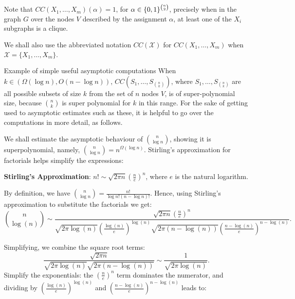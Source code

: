 Note that $CC\left(X_1, \ldots, X_m\right)(\alpha)=1$, for $\alpha\in\{0,1\}^{n\choose 2}$, precisely when in the graph $G$ over the nodes $V$ described by the assignment $\alpha$, at least one of the $X_i$ subgraphs is a clique. 

We shall also use the abbreviated notation $CC(\mathcal X)$ for $CC(X_1,\dots,X_m)$ when $\mathcal X = \{X_1,\dots,X_m\}$.


\begin{trailer}{Example of simple useful asymptotic computations}
When $k\in(\Omega(\log n),O(n-\log n))$, $CC\left(S_1, \ldots, S_{n\choose k}\right)$, where $S_1,\dots,S_{n\choose k}$ are all possible subsets of size $k$ from the set of $n$ nodes $V$, is of super-polynomial size, because $ n\choose k$ is super polynomial for $k$ in this range. For the sake of getting used to asymptotic estimates such as these, it is helpful to go over the computations in more detail, as follows.

We shall estimate the asymptotic behaviour of $\binom{n}{\log n} $, showing it is superpolynomial, namely, $\binom{n}{\log n} =
n^{\Omega(\log n)}$. Stirling's approximation for factorials helps simplify the expressions: 
\begin{tcolorbox}[colframe=white, colback=gray!5, boxrule=0mm, sharp corners]
\textbf{Stirling's Approximation}:
$n!\sim \sqrt{2 \pi n}\left(\frac{n}{e}\right)^n$, where $e$ is the natural logarithm.
\end{tcolorbox}

By definition, we have $\binom{n}{\log n} =\frac{n!}{\log n!(n-\log n)!}$. Hence, using Stirling's approximation to substitute the factorials we get:
\[
 \binom{n}{\log(n)} \sim \frac{\sqrt{2 \pi n} \left(\frac{n}{e}\right)^n}{\sqrt{2 \pi \log(n)} \left(\frac{\log(n)}{e}\right)^{\log(n)} \sqrt{2 \pi (n - \log(n))} \left(\frac{n - \log(n)}{e}\right)^{n - \log(n)}}.
\]
 
Simplifying, we combine the square root terms:
   \[
   \frac{\sqrt{2 \pi n}}{\sqrt{2 \pi \log(n)} \sqrt{2 \pi (n - \log(n))}} \sim \frac{1}{\sqrt{2 \pi \log(n)}}.
   \]
Simplify the exponentials:    the \(\left(\frac{n}{e}\right)^n\) term dominates the numerator, and dividing by \(\left(\frac{\log(n)}{e}\right)^{\log(n)}\) and \(\left(\frac{n - \log(n)}{e}\right)^{n - \log(n)}\) leads to:


\end{trailer}
